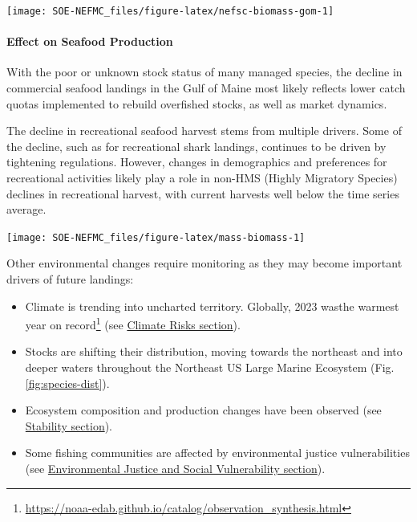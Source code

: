 \documentclass[
  10pt,
]{article}
\providecommand{\tightlist}{%
  \setlength{\itemsep}{0pt}\setlength{\parskip}{0pt}}
\let\origfigure\figure
\let\endorigfigure\endfigure
\renewenvironment{figure}[1][2] {
    \expandafter\origfigure\expandafter[H]
} {
    \endorigfigure
}
\begin{document}
\begin{figure}

{\centering \texttt{[image: SOE-NEFMC\_files/figure-latex/nefsc-biomass-gom-1]} 

}

\caption{Spring (left) and fall (right) surveyed biomass in the Gulf of Maine. The shaded area around each annual mean represents 2 standard deviations from the mean.}\label{fig:nefsc-biomass-gom}
\end{figure}

\hypertarget{effect-on-seafood-production}{%
\paragraph{Effect on Seafood Production}\label{effect-on-seafood-production}}

With the poor or unknown stock status of many managed species, the decline in commercial seafood landings in the Gulf of Maine most likely reflects lower catch quotas implemented to rebuild overfished stocks, as well as market dynamics.

The decline in recreational seafood harvest stems from multiple drivers. Some of the decline, such as for recreational shark landings, continues to be driven by tightening regulations. However, changes in demographics and preferences for recreational activities likely play a role in non-HMS (Highly Migratory Species) declines in recreational harvest, with current harvests well below the time series average.

\begin{figure}

{\centering \texttt{[image: SOE-NEFMC\_files/figure-latex/mass-biomass-1]} 

}

\caption{Spring (left) and fall (right) surveyed biomass from the state of Massachusetts inshore survey. The shaded area around each annual mean represents 2 standard deviations from the mean.}\label{fig:mass-biomass}
\end{figure}

Other environmental changes require monitoring as they may become important drivers of future landings:

\begin{itemize}
\tightlist
\item
  Climate is trending into uncharted territory. Globally, 2023 wasthe warmest year on record\footnote{\url{https://noaa-edab.github.io/catalog/observation_synthesis.html}} (see \protect\hyperlink{climate-risks}{Climate Risks section}).
\item
  Stocks are shifting their distribution, moving towards the northeast and into deeper waters throughout the Northeast US Large Marine Ecosystem (Fig. \ref{fig:species-dist}).
\item
  Ecosystem composition and production changes have been observed (see \protect\hyperlink{stability}{Stability section}).
\item
  Some fishing communities are affected by environmental justice vulnerabilities (see \protect\hyperlink{social-vulnerability}{Environmental Justice and Social Vulnerability section}).
\end{itemize}
\end{document}
